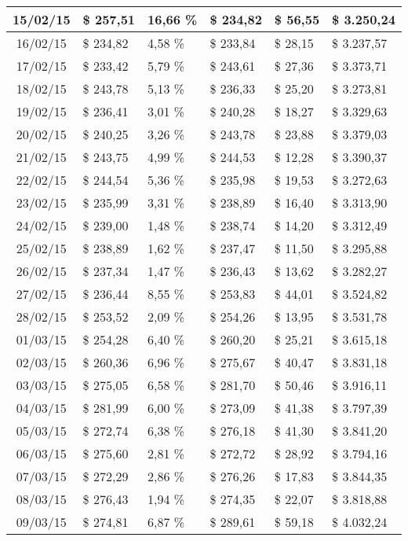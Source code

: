 \begin{small}
\begin{longtable}{|c|l|l|l|l|l|}
15/02/15 & \$ 257,51 & 16,66 \% & \$ 234,82 & \$ 56,55 & \$ 3.250,24 \\ \hline
16/02/15 & \$ 234,82 & 4,58 \% & \$ 233,84 & \$ 28,15 & \$ 3.237,57 \\ \hline
17/02/15 & \$ 233,42 & 5,79 \% & \$ 243,61 & \$ 27,36 & \$ 3.373,71 \\ \hline
18/02/15 & \$ 243,78 & 5,13 \% & \$ 236,33 & \$ 25,20 & \$ 3.273,81 \\ \hline
19/02/15 & \$ 236,41 & 3,01 \% & \$ 240,28 & \$ 18,27 & \$ 3.329,63 \\ \hline
20/02/15 & \$ 240,25 & 3,26 \% & \$ 243,78 & \$ 23,88 & \$ 3.379,03 \\ \hline
21/02/15 & \$ 243,75 & 4,99 \% & \$ 244,53 & \$ 12,28 & \$ 3.390,37 \\ \hline
22/02/15 & \$ 244,54 & 5,36 \% & \$ 235,98 & \$ 19,53 & \$ 3.272,63 \\ \hline
23/02/15 & \$ 235,99 & 3,31 \% & \$ 238,89 & \$ 16,40 & \$ 3.313,90 \\ \hline
24/02/15 & \$ 239,00 & 1,48 \% & \$ 238,74 & \$ 14,20 & \$ 3.312,49 \\ \hline
25/02/15 & \$ 238,89 & 1,62 \% & \$ 237,47 & \$ 11,50 & \$ 3.295,88 \\ \hline
26/02/15 & \$ 237,34 & 1,47 \% & \$ 236,43 & \$ 13,62 & \$ 3.282,27 \\ \hline
27/02/15 & \$ 236,44 & 8,55 \% & \$ 253,83 & \$ 44,01 & \$ 3.524,82 \\ \hline
28/02/15 & \$ 253,52 & 2,09 \% & \$ 254,26 & \$ 13,95 & \$ 3.531,78 \\ \hline
01/03/15 & \$ 254,28 & 6,40 \% & \$ 260,20 & \$ 25,21 & \$ 3.615,18 \\ \hline
02/03/15 & \$ 260,36 & 6,96 \% & \$ 275,67 & \$ 40,47 & \$ 3.831,18 \\ \hline
03/03/15 & \$ 275,05 & 6,58 \% & \$ 281,70 & \$ 50,46 & \$ 3.916,11 \\ \hline
04/03/15 & \$ 281,99 & 6,00 \% & \$ 273,09 & \$ 41,38 & \$ 3.797,39 \\ \hline
05/03/15 & \$ 272,74 & 6,38 \% & \$ 276,18 & \$ 41,30 & \$ 3.841,20 \\ \hline
06/03/15 & \$ 275,60 & 2,81 \% & \$ 272,72 & \$ 28,92 & \$ 3.794,16 \\ \hline
07/03/15 & \$ 272,29 & 2,86 \% & \$ 276,26 & \$ 17,83 & \$ 3.844,35 \\ \hline
08/03/15 & \$ 276,43 & 1,94 \% & \$ 274,35 & \$ 22,07 & \$ 3.818,88 \\ \hline
09/03/15 & \$ 274,81 & 6,87 \% & \$ 289,61 & \$ 59,18 & \$ 4.032,24 \\ \hline

\end{longtable}
\end{small}
